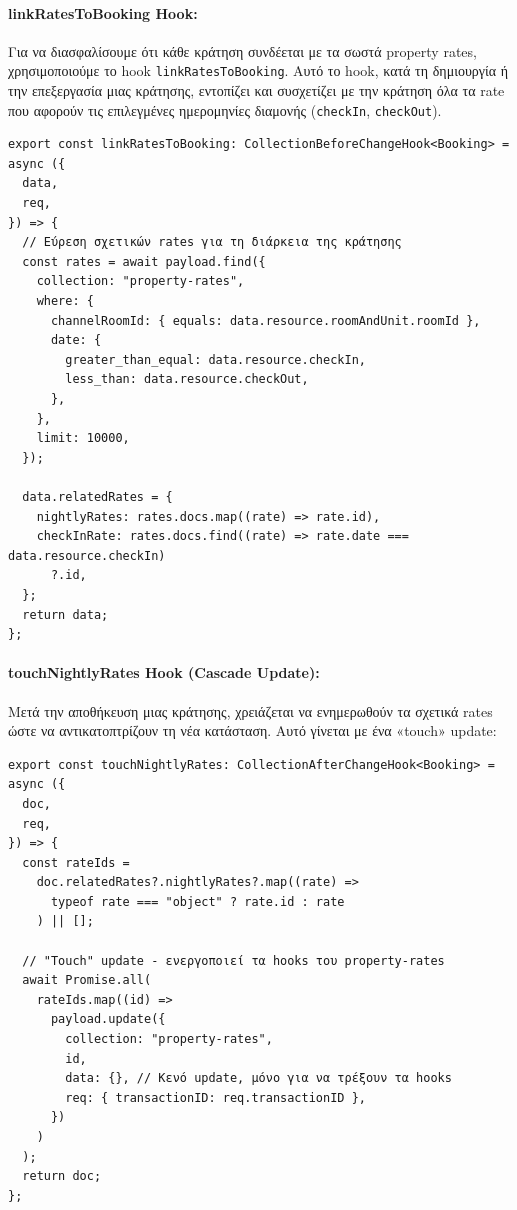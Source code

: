 \documentclass[
	12pt, %
	oneside, %
	greek,
	onehalfspacing, %
	liststotoc, %
	toctotoc, %
	parskip, %
	headsepline, %
]{MastersDoctoralThesis} %
\begin{document}
\paragraph{linkRatesToBooking Hook:} Για να διασφαλίσουμε ότι κάθε κράτηση συνδέεται με τα σωστά property rates, χρησιμοποιούμε το hook \texttt{linkRatesToBooking}. Αυτό το hook, κατά τη δημιουργία ή την επεξεργασία μιας κράτησης, εντοπίζει και συσχετίζει με την κράτηση όλα τα rate που αφορούν τις επιλεγμένες ημερομηνίες διαμονής (\texttt{checkIn}, \texttt{checkOut}).

\begin{lstlisting}[caption={linkRatesToBooking Hook}]
export const linkRatesToBooking: CollectionBeforeChangeHook<Booking> = async ({
  data,
  req,
}) => {
  // Εύρεση σχετικών rates για τη διάρκεια της κράτησης
  const rates = await payload.find({
    collection: "property-rates",
    where: {
      channelRoomId: { equals: data.resource.roomAndUnit.roomId },
      date: {
        greater_than_equal: data.resource.checkIn,
        less_than: data.resource.checkOut,
      },
    },
    limit: 10000,
  });

  data.relatedRates = {
    nightlyRates: rates.docs.map((rate) => rate.id),
    checkInRate: rates.docs.find((rate) => rate.date === data.resource.checkIn)
      ?.id,
  };
  return data;
};
\end{lstlisting}

\paragraph{touchNightlyRates Hook (Cascade Update):}

Μετά την αποθήκευση μιας κράτησης, χρειάζεται να ενημερωθούν τα σχετικά rates ώστε να αντικατοπτρίζουν τη νέα κατάσταση. Αυτό γίνεται με ένα «touch» update:

\begin{lstlisting}[caption={touchNightlyRates Hook}]
export const touchNightlyRates: CollectionAfterChangeHook<Booking> = async ({
  doc,
  req,
}) => {
  const rateIds =
    doc.relatedRates?.nightlyRates?.map((rate) =>
      typeof rate === "object" ? rate.id : rate
    ) || [];

  // "Touch" update - ενεργοποιεί τα hooks του property-rates
  await Promise.all(
    rateIds.map((id) =>
      payload.update({
        collection: "property-rates",
        id,
        data: {}, // Κενό update, μόνο για να τρέξουν τα hooks
        req: { transactionID: req.transactionID },
      })
    )
  );
  return doc;
};
\end{lstlisting}
\end{document}
